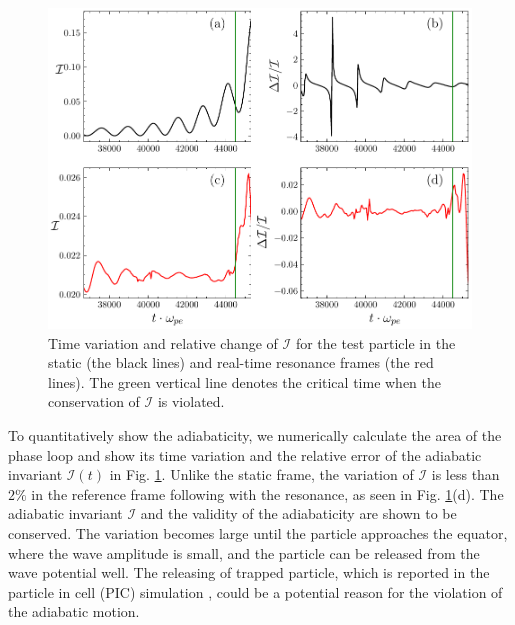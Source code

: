 \begin{figure}
    \centering
    \includegraphics[scale=0.5]{img/adiaI.pdf}
    \caption{Time variation and  relative change of $\mathcal{I}$ for the test particle in the static (the black lines) and  real-time resonance  frames (the red lines). The green vertical line denotes the critical time when the conservation of $\mathcal{I}$ is violated.
    }
    \label{fig.I}
\end{figure}
To quantitatively show the adiabaticity, we numerically calculate the area of the phase loop and show its time variation 
and the relative error of the adiabatic invariant $\mathcal{I}(t)$ in Fig. \ref{fig.I}.
Unlike the static frame, the variation of $\mathcal{I}$ is less than $2\%$ in the reference frame following with the resonance, as seen in Fig. \ref{fig.I}(d). 
The adiabatic invariant $\mathcal{I}$ and the validity of the adiabaticity are shown to be conserved. 
The variation becomes large until the particle approaches the equator, where the wave amplitude is small, and the particle can be released from the wave potential well. 
The releasing of trapped particle, which is reported in the particle in cell (PIC) simulation \cite{tao_trap-release-amplify_2021}, could be a potential reason for the violation of the adiabatic motion.


